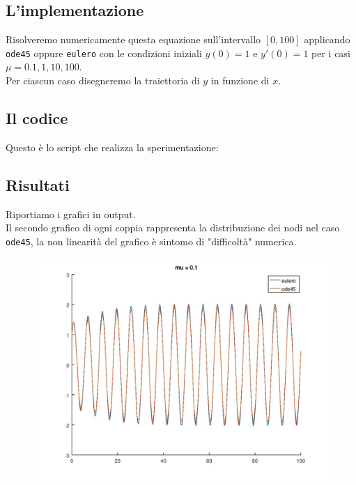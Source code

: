 \documentclass{article}
\begin{document}
	\subsection{L'implementazione}
	Risolveremo numericamente questa equazione sull'intervallo $[0, 100]$ applicando {\tt ode45} oppure {\tt eulero} con le condizioni iniziali $y(0) = 1$ e $y'(0) = 1$ per i casi $\mu = 0.1, 1, 10, 100$.\\
	Per ciascun caso disegneremo la traiettoria di $y$ in funzione di $x$.
	\subsection{Il codice}
	Questo è lo script che realizza la sperimentazione:
	
	
	\subsection{Risultati}
	Riportiamo i grafici in output.\\
	Il secondo grafico di ogni coppia rappresenta la distribuzione dei nodi nel caso {\tt ode45}, la non linearità del grafico è sintomo di "difficoltà" numerica.\\
	\begin{figure}[htp!]
		\centering 
		\includegraphics[width=\textwidth]{6_3_1.jpeg}
	\end{figure}
\end{document}
